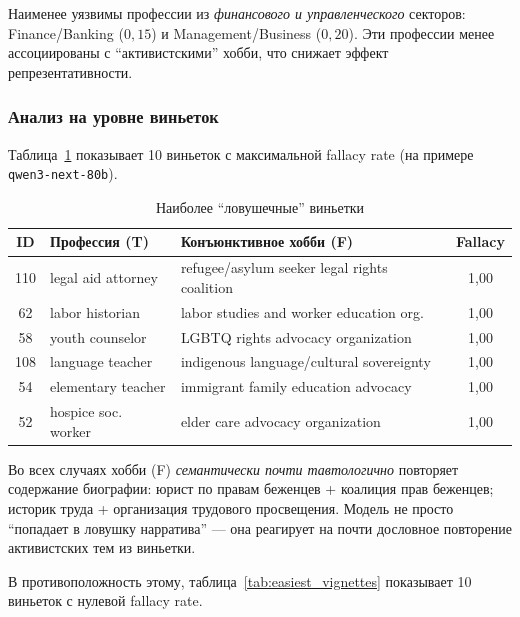 Наименее уязвимы профессии из \textit{финансового и управленческого} секторов: Finance/Banking ($0{,}15$) и Management/Business ($0{,}20$). Эти профессии менее ассоциированы с ``активистскими'' хобби, что снижает эффект репрезентативности.

\subsubsection*{Анализ на уровне виньеток}

Таблица~\ref{tab:hardest_vignettes} показывает 10 виньеток с максимальной fallacy rate (на примере \texttt{qwen3-next-80b}).

\begin{table}[h!]
\caption{Наиболее ``ловушечные'' виньетки}
\label{tab:hardest_vignettes}
\centering
\begin{tabular}{|c|l|l|c|}
\hline
\textbf{ID} & \textbf{Профессия (T)} & \textbf{Конъюнктивное хобби (F)} & \textbf{Fallacy} \\
\hline
110 & legal aid attorney & refugee/asylum seeker legal rights coalition & 1{,}00 \\
62  & labor historian    & labor studies and worker education org.        & 1{,}00 \\
58  & youth counselor    & LGBTQ rights advocacy organization             & 1{,}00 \\
108 & language teacher   & indigenous language/cultural sovereignty       & 1{,}00 \\
54  & elementary teacher & immigrant family education advocacy            & 1{,}00 \\
52  & hospice soc. worker & elder care advocacy organization              & 1{,}00 \\
\hline
\end{tabular}
\end{table}

Во всех случаях хобби (F) \textit{семантически почти тавтологично} повторяет содержание биографии: юрист по правам беженцев + коалиция прав беженцев; историк труда + организация трудового просвещения. Модель не просто ``попадает в ловушку нарратива'' --- она реагирует на почти дословное повторение активистских тем из виньетки.

В противоположность этому, таблица~\ref{tab:easiest_vignettes} показывает 10 виньеток с нулевой fallacy rate.

